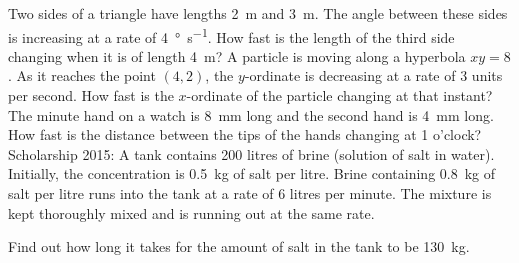 \begin{questions}
  \questioM Two sides of a triangle have lengths \SI{2}{\metre} and \SI{3}{\metre}. The angle between these sides is increasing
            at a rate of \SI{4}{\degree\per\second}. How fast is the length of the third side changing when it is of length \SI{4}{\metre}?
  \questioE A particle is moving along a hyperbola $ xy = 8 $. As it reaches the point $ (4, 2) $, the $ y$-ordinate is decreasing
            at a rate of 3 units per second. How fast is the $ x$-ordinate of the particle changing at that instant?
  \questioE The minute hand on a watch is \SI{8}{\milli\metre} long and the second hand is \SI{4}{\milli\metre} long. How fast is
            the distance between the tips of the hands changing at 1 o'clock?
  \questioS Scholarship 2015: A tank contains 200 litres of brine (solution of salt in water). Initially, the concentration is \SI{0.5}{\kilo\gram}
            of salt per litre. Brine containing \SI{0.8}{\kilo\gram} of salt per litre runs into the tank at a rate of 6 litres per
            minute. The mixture is kept thoroughly mixed and is running out at the same rate.

            Find out how long it takes for the amount of salt in the tank to be \SI{130}{\kilo\gram}.
\end{questions}

